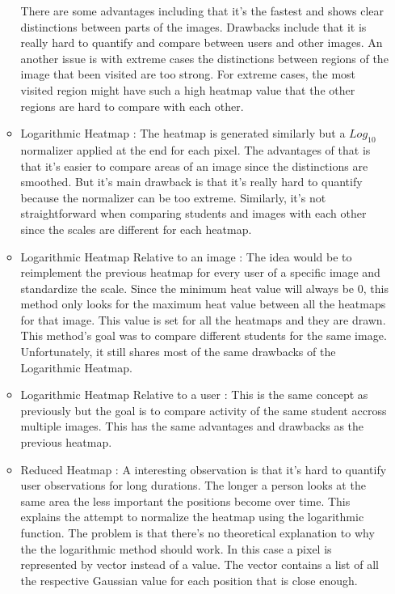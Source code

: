 \documentclass[a4paper,11pt]{report}
\numberwithin{figure}{section} %
\begin{document}
\begin{itemize}
\begin{itemize}
            There are some advantages including that it's the fastest and shows clear distinctions between parts of the images.
            Drawbacks include that it is really hard to quantify and compare between users and other images.
            An another issue is with extreme cases the distinctions between regions of the image that been visited are too strong.
            For extreme cases, the most visited region might have such a high heatmap value that the other regions are hard to compare with each other.
            \item Logarithmic Heatmap : The heatmap is generated similarly but a $Log_{10}$ normalizer applied at the end for each pixel.
            The advantages of that is that it's easier to compare areas of an image since the distinctions are smoothed.
            But it's main drawback is that it's really hard to quantify because the normalizer can be too extreme.
            Similarly, it's not straightforward when comparing students and images with each other since the scales are different for each heatmap.
            \item Logarithmic Heatmap Relative to an image : The idea would be to reimplement the previous heatmap for every user of a specific image and standardize the scale.
            Since the minimum heat value will always be 0, this method only looks for the maximum heat value between all the heatmaps for that image.
            This value is set for all the heatmaps and they are drawn. This method's goal was to compare different students for the same image.
            Unfortunately, it still shares most of the same drawbacks of the Logarithmic Heatmap.
            \item Logarithmic Heatmap Relative to a user : This is the same concept as previously but the goal is to compare activity of the same student accross multiple images.
            This has the same advantages and drawbacks as the previous heatmap.
            \item Reduced Heatmap : A interesting observation is that it's hard to quantify user observations for long durations.
            The longer a person looks at the same area the less important the positions become over time.
            This explains the attempt to normalize the heatmap using the logarithmic function.
            The problem is that there's no theoretical explanation to why the the logarithmic method should work.
            In this case a pixel is represented by vector instead of a value.
            The vector contains a list of all the respective Gaussian value for each position that is close enough.

\end{itemize}
\end{itemize}
\end{document}
